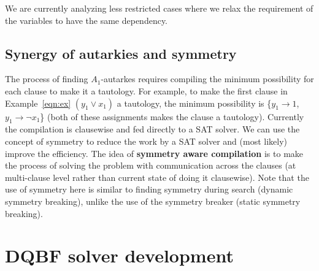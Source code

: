 \documentclass[conference]{IEEEtran}
\begin{document}
We are currently analyzing less restricted cases where we relax the requirement of the variables to have the same dependency. 

%


\subsection{Synergy of autarkies and symmetry}

The process of finding $A_{1}$-autarkes requires compiling the minimum possibility for each clause to make it a tautology.
%
For example, to make the first clause in Example~\ref{eqn:ex} $(y_1 \lor x_1)$ a tautology, the minimum possibility is \{$y_1 \to 1$, $y_1 \to \neg x_1$\} (both of these assignments makes the clause a tautology).
%
Currently the compilation is clausewise and fed directly to a SAT solver.
%
We can use the concept of symmetry to reduce the work by a SAT solver and (most likely) improve the efficiency.
%
The idea of \textbf{symmetry aware compilation} is to make the process of solving the problem with communication across the clauses (at multi-clause level rather than current state of doing it clausewise).
%
%
Note that the use of symmetry here is similar to finding symmetry during search (dynamic symmetry breaking), unlike the use of the symmetry breaker (static symmetry breaking). 
 

\section{DQBF solver development}
\label{sec:dev}
\end{document}
